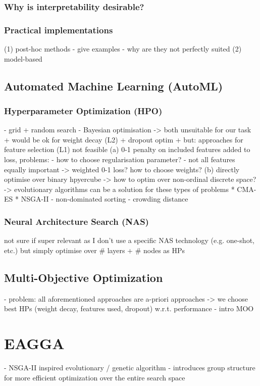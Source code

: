 \documentclass[twoside,11pt]{article}
\begin{document}
\subsubsection{Why is interpretability desirable?}
\subsubsection{Practical implementations}
(1) post-hoc methods
  - give examples
  - why are they not perfectly suited
(2) model-based

\subsection{Automated Machine Learning (AutoML)}
\subsubsection{Hyperparameter Optimization (HPO)}
- grid + random search
- Bayesian optimisation
-> both unsuitable for our task
  + would be ok for weight decay (L2) + dropout optim
  + but: approaches for feature selection (L1) not feasible
    (a) 0-1 penalty on included features added to loss, problems:
      - how to choose regularisation parameter?
      - not all features equally important -> weighted 0-1 loss? how to choose weights?
    (b) directly optimise over binary hpyercube -> how to optim over non-ordinal discrete space?
-> evolutionary algorithms can be a solution for these types of problems
  * CMA-ES
  * NSGA-II
    - non-dominated sorting
    - crowding distance
\subsubsection{Neural Architecture Search (NAS)}
not sure if super relevant as I don't use a specific NAS technology (e.g. one-shot, etc.) but simply optimise over \# layers + \# nodes as HPs

\subsection{Multi-Objective Optimization}
- problem: all aforementioned approaches are a-priori approaches -> we choose best HPs (weight decay, features used, dropout) w.r.t. performance
- intro MOO


\section{EAGGA}
- NSGA-II inspired evolutionary / genetic algorithm
- introduces group structure for more efficient optimization over the entire search space
\end{document}
